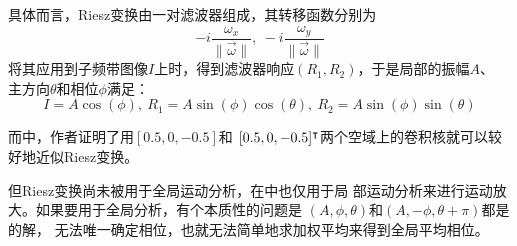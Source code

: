 具体而言，Riesz变换由一对滤波器组成，其转移函数分别为
\begin{equation}
    -i\frac{\omega_x}{\parallel \overrightarrow{ \omega} \parallel},~
    -i\frac{\omega_y}{\parallel \overrightarrow{ \omega} \parallel}
\end{equation}
将其应用到子频带图像$I$上时，得到滤波器响应$(R_1, R_2)$，于是局部的振幅$A$、
主方向$\theta$和相位$\phi$满足：
\begin{equation}
    I = A\cos(\phi),~R_1 = A\sin(\phi)\cos(\theta),~
    R_2 = A\sin(\phi)\sin(\theta)
    \label{eqn:riesz:decomp}
\end{equation}

而\cite{Wadhwa2014RieszPyramid}中，作者证明了用$[0.5,0,-0.5]$和
$[0.5,0,-0.5]^\intercal$两个空域上的卷积核就可以较好地近似Riesz变换。

但Riesz变换尚未被用于全局运动分析，在\cite{Wadhwa2014RieszPyramid}中也仅用于局
部运动分析来进行运动放大。如果要用于全局分析，有个本质性的问题是
$(A, \phi, \theta)$和$(A, -\phi, \theta + \pi)$都是的解，
无法唯一确定相位，也就无法简单地求加权平均来得到全局平均相位。

